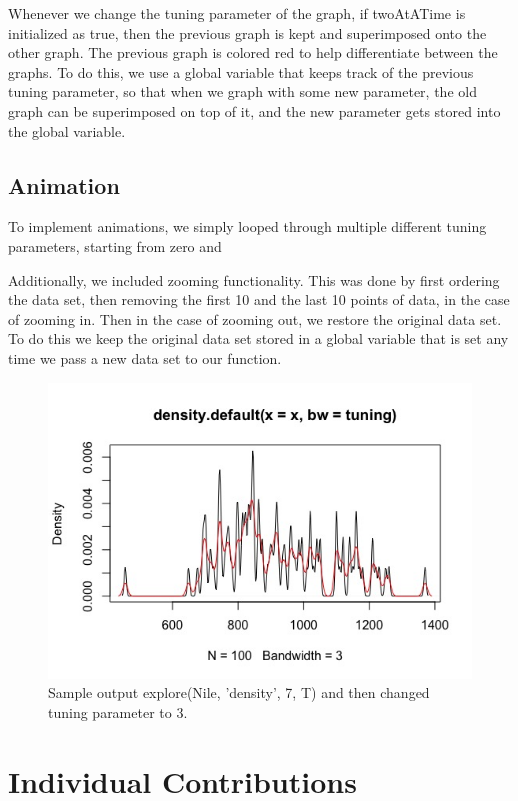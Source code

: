 \documentclass{article}
\begin{document}
Whenever we change the tuning parameter of the graph, if twoAtATime is initialized as true, then the previous graph is kept and superimposed onto the other graph. The previous graph is colored red to help differentiate between the graphs. To do this, we use a global variable that keeps track of the previous tuning parameter, so that when we graph with some new parameter, the old graph can be superimposed on top of it, and the new parameter gets stored into the global variable.

\subsection{Animation}

To implement animations, we simply looped through multiple different tuning parameters, starting from zero and 

Additionally, we included zooming functionality. This was done by first ordering the data set, then removing the first 10 and the last 10 points of data, in the case of zooming in. Then in the case of zooming out, we restore the original data set. To do this we keep the original data set stored in a global variable that is set any time we pass a new data set to our function.

\begin{figure}[h!]
\centering
\includegraphics[scale=0.5]{Nile, 7 superimposed on 3.jpeg}
\caption{Sample output explore(Nile, 'density', 7, T) and then changed tuning parameter to 3. }
\label{fig:Nile density graph}
\end{figure}

\section{Individual Contributions}
\end{document}
